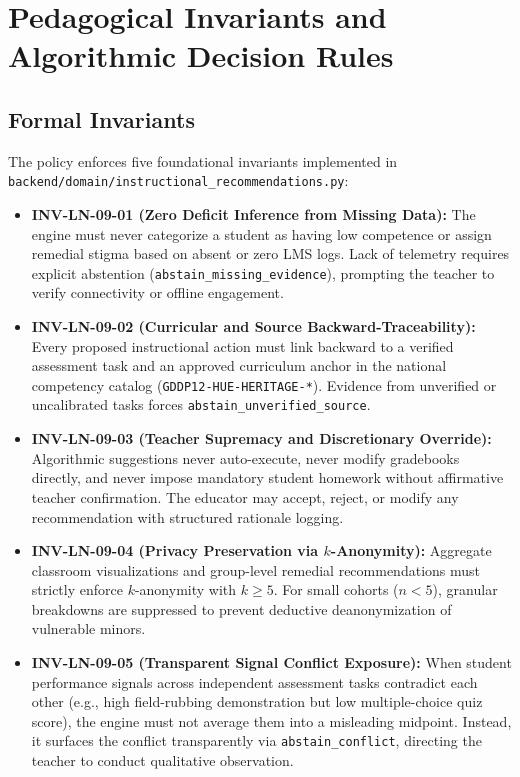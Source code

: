 \documentclass[11pt,a4paper]{article}
\begin{document}
\section{Pedagogical Invariants and Algorithmic Decision Rules}

\subsection{Formal Invariants}
The policy enforces five foundational invariants implemented in \texttt{backend/domain/instructional\_recommendations.py}:

\begin{itemize}
    \item \textbf{\textsc{INV-LN-09-01} (Zero Deficit Inference from Missing Data):} The engine must never categorize a student as having low competence or assign remedial stigma based on absent or zero LMS logs. Lack of telemetry requires explicit abstention (\texttt{abstain\_missing\_evidence}), prompting the teacher to verify connectivity or offline engagement.
    \item \textbf{\textsc{INV-LN-09-02} (Curricular and Source Backward-Traceability):} Every proposed instructional action must link backward to a verified assessment task and an approved curriculum anchor in the national competency catalog (\texttt{GDDP12-HUE-HERITAGE-*}). Evidence from unverified or uncalibrated tasks forces \texttt{abstain\_unverified\_source}.
    \item \textbf{\textsc{INV-LN-09-03} (Teacher Supremacy and Discretionary Override):} Algorithmic suggestions never auto-execute, never modify gradebooks directly, and never impose mandatory student homework without affirmative teacher confirmation. The educator may accept, reject, or modify any recommendation with structured rationale logging.
    \item \textbf{\textsc{INV-LN-09-04} (Privacy Preservation via $k$-Anonymity):} Aggregate classroom visualizations and group-level remedial recommendations must strictly enforce $k$-anonymity with $k \ge 5$. For small cohorts ($n < 5$), granular breakdowns are suppressed to prevent deductive deanonymization of vulnerable minors.
    \item \textbf{\textsc{INV-LN-09-05} (Transparent Signal Conflict Exposure):} When student performance signals across independent assessment tasks contradict each other (e.g., high field-rubbing demonstration but low multiple-choice quiz score), the engine must not average them into a misleading midpoint. Instead, it surfaces the conflict transparently via \texttt{abstain\_conflict}, directing the teacher to conduct qualitative observation.
\end{itemize}
\end{document}
